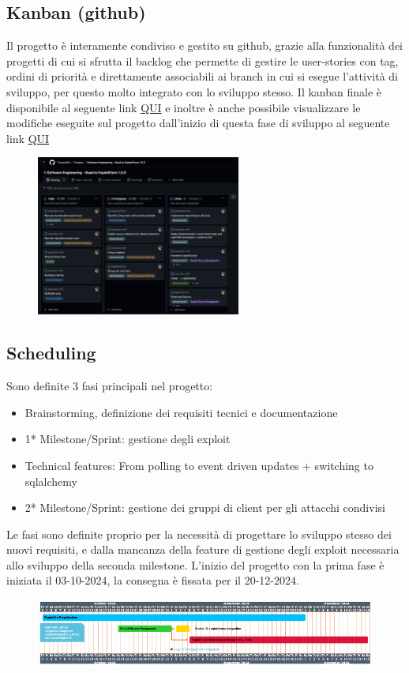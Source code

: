 \documentclass[11pt]{article}
\begin{document}
\subsection{Kanban (github)}
Il progetto è interamente condiviso e gestito su github, grazie alla funzionalità dei progetti di cui si sfrutta il backlog che permette di gestire le user-stories con tag, ordini di priorità e direttamente associabili ai branch in cui si esegue l'attività di sviluppo, per questo molto integrato con lo sviluppo stesso.
Il kanban finale è disponibile al seguente link
	\href{https://github.com/orgs/Pwnzer0tt1/projects/1}{QUI} e inoltre è anche possibile visualizzare le modifiche eseguite sul progetto dall'inizio di questa fase di sviluppo al seguente link \href{https://github.com/Pwnzer0tt1/exploitfarm/compare/0be4b22b0676dede1836719639ae2edc3a508504...c9f8c3c28bd88ca35072ffe24f16c19e4b27c2e9}{QUI}
	\begin{figure}[H]
    	\centering
    	\includegraphics[width=0.6\textwidth]{backlog.png}
	\end{figure}
\subsection{Scheduling}
Sono definite 3 fasi principali nel progetto:
\begin{itemize}
    \item Brainstorming, definizione dei requisiti tecnici e documentazione
    \item 1* Milestone/Sprint: gestione degli exploit
    \item Technical features: From polling to event driven updates + switching to sqlalchemy
    \item 2* Milestone/Sprint: gestione dei gruppi di client per gli attacchi condivisi
\end{itemize}
Le fasi sono definite proprio per la necessità di progettare lo sviluppo stesso dei nuovi requisiti, e dalla mancanza della feature di gestione degli exploit necessaria allo sviluppo della seconda milestone.
L'inizio del progetto con la prima fase è iniziata il 03-10-2024, la consegna è fissata per il 20-12-2024.
	\begin{figure}[H]
		\centering
    	\includegraphics[width=1\textwidth]{scheduling.png}
	\end{figure}
\end{document}

